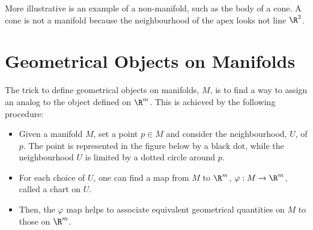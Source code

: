 More illustrative is an example of a non-manifold, such as the body of a cone. A cone is not a manifold because the neighbourhood of the apex looks not line $\R^2$.
\begin{center}
\end{center}

\section{Geometrical Objects on Manifolds}

The trick to define geometrical objects on  manifolds, $M$, is to find a way to assign an analog to the object defined on $\R^m$. This is achieved by the following procedure:
\begin{itemize}
\item Given a manifold $M$, set a point $p\in M$ and consider the neighbourhood, $U$, of $p$. The point is represented in the figure below by a black dot, while the neighbourhood $U$ is limited by a dotted circle around $p$.
\item For each choice of $U$, one can find a map from $M$ to $\R^m$, $\varphi:M\to \R^m$, called a chart on $U$.
\item Then, the $\varphi$ map helps to associate equivalent geometrical quantities on $M$ to those on $\R^m$.
\end{itemize}
\begin{center}
  \begin{tikzpicture}
    
  \end{tikzpicture}
\end{center}

